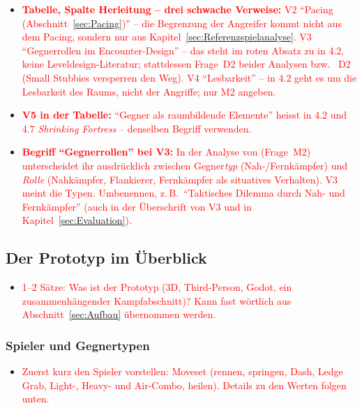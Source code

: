 \documentclass[../Main.tex]{subfiles}
\begin{document}
\begin{itemize}[leftmargin=1.5cm]
    \item \textcolor{red}{\textbf{Tabelle, Spalte Herleitung -- drei schwache Verweise:} V2 \enquote{Pacing (Abschnitt~\ref{sec:Pacing})} -- die Begrenzung der Angreifer kommt nicht aus dem Pacing, sondern nur aus Kapitel~\ref{sec:Referenzspielanalyse}. V3 \enquote{Gegnerrollen im Encounter-Design} -- das steht im roten Absatz zu  in 4.2, keine Leveldesign-Literatur; stattdessen Frage~D2 beider Analysen bzw.\  D2 (Small Stubbies versperren den Weg). V4 \enquote{Lesbarkeit} -- in 4.2 geht es um die Lesbarkeit des Raums, nicht der Angriffe; nur  M2 angeben.}
    \item \textcolor{red}{\textbf{V5 in der Tabelle:} \enquote{Gegner als raumbildende Elemente} heisst in 4.2 und 4.7 \textit{Shrinking Fortress} -- denselben Begriff verwenden.}
    \item \textcolor{red}{\textbf{Begriff \enquote{Gegnerrollen} bei V3:} In der Analyse von  (Frage~M2) unterscheidet ihr ausdrücklich zwischen Gegner\emph{typ} (Nah-/Fernkämpfer) und \emph{Rolle} (Nahkämpfer, Flankierer, Fernkämpfer als situatives Verhalten). V3 meint die Typen. Umbenennen, z.\,B.\ \enquote{Taktisches Dilemma durch Nah- und Fernkämpfer} (auch in der Überschrift von V3 und in Kapitel~\ref{sec:Evaluation}).}
\end{itemize}

\subsection{Der Prototyp im Überblick} \label{sec:Prototyp}

\begin{itemize}[leftmargin=1.5cm]
    \item \textcolor{red}{1--2 Sätze: Was ist der Prototyp (3D, Third-Person, Godot, ein zusammenhängender Kampfabschnitt)? Kann fast wörtlich aus Abschnitt~\ref{sec:Aufbau} übernommen werden.}
\end{itemize}

\subsubsection{Spieler und Gegnertypen} \label{sec:Gegnertypen}

\begin{itemize}[leftmargin=1.5cm]
    \item \textcolor{red}{Zuerst kurz den Spieler vorstellen: Moveset (rennen, springen, Dash, Ledge Grab, Light-, Heavy- und Air-Combo, heilen). Details zu den Werten folgen unten.}
\end{itemize}
\end{document}

